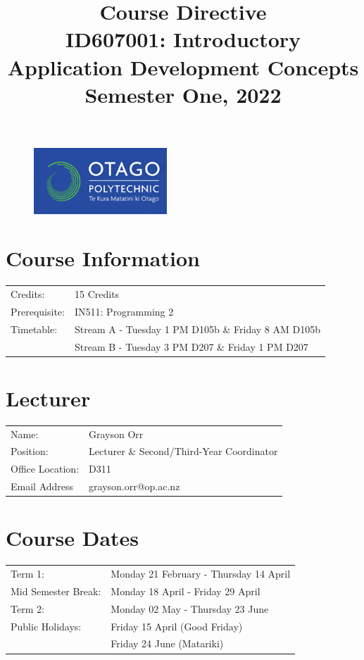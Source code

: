 \documentclass{article}
\author{}
\begin{document}
 

\begin{figure}
	\includegraphics[width=50mm]{../img/logo.png} 
\end{figure}

\title{Course Directive\\ID607001: Introductory Application Development Concepts\\Semester One, 2022}
\date{}
\maketitle

\section*{Course Information}
\begin{tabular}{ll}
	Credits:            & 15 Credits                             \\
	Prerequisite:       & IN511: Programming 2                   \\
	Timetable:  & Stream A - Tuesday 1 PM D105b \& Friday 8 AM D105b  \\    
	  			& Stream B - Tuesday 3 PM D207 \& Friday 1 PM D207  \\   
\end{tabular} 

\section*{Lecturer}
\begin{tabular}{ll}
	Name:            & Grayson Orr                            \\
	Position:       & Lecturer \& Second/Third-Year Coordinator                   \\
	Office Location:  & D311  \\    
	Email Address  & grayson.orr@op.ac.nz  \\   
\end{tabular}

\section*{Course Dates}
\begin{tabular}{ll} 
	Term 1:             & Monday 21 February - Thursday 14 April  \\
	Mid Semester Break: & Monday 18 April - Friday 29 April    \\
	Term 2:             & Monday 02 May - Thursday 23 June    \\
	Public Holidays:   & Friday 15 April (Good Friday) \\
	& Friday 24 June (Matariki)
\end{tabular}
\end{document}
